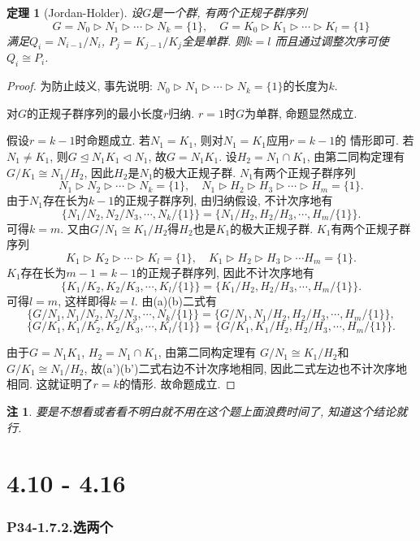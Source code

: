 \documentclass[12pt, a4paper, fontset=windows]{ctexart}
\newcommand{\isom}{\cong} %
\newtheorem*{remark}{注}
\newtheorem*{theorem}{定理}
\begin{document}
\begin{theorem}[Jordan-Holder]
设$G$是一个群, 有两个正规子群序列
\[G=N_0\rhd N_1\rhd\cdots\rhd N_k=\{1\},\quad G=K_0\rhd K_1\rhd\cdots\rhd K_l=\{1\}\]
满足$Q_i=N_{i-1}/N_i$, $P_j=K_{j-1}/K_j$全是单群. 则$k=l$
而且通过调整次序可使$Q_i\isom P_i$. 
\end{theorem}

\begin{proof}
为防止歧义, 事先说明: $N_0\rhd N_1\rhd\cdots\rhd N_k=\{1\}$的长度为$k$. 

对$G$的正规子群序列的最小长度$r$归纳. $r=1$时$G$为单群, 命题显然成立. 

假设$r=k-1$时命题成立. 若$N_1=K_1$, 则对$N_1=K_1$应用$r=k-1$的
情形即可. 若$N_1\ne K_1$, 则$G\unlhd N_1K_1\lhd N_1$, 
故$G=N_1K_1$. 设$H_2=N_1\cap K_1$, 
由第二同构定理有$G/K_1\isom N_1/H_2$, 因此$H_2$是$N_1$的极大正规子群. 
$N_1$有两个正规子群序列
\[N_1\rhd N_2\rhd\cdots\rhd N_k=\{1\},\quad N_1\rhd H_2\rhd H_3\rhd\cdots\rhd H_m=\{1\}. \]
由于$N_1$存在长为$k-1$的正规子群序列, 由归纳假设, 不计次序地有
\[\{N_1/N_2,N_2/N_3,\cdots,N_k/\{1\}\}=\{N_1/H_2,H_2/H_3,\cdots,H_m/\{1\}\}.\tag*{(a)}\]
可得$k=m$. 又由$G/N_1\isom K_1/H_2$得$H_2$也是$K_1$的极大正规子群. 
$K_1$有两个正规子群序列
\[K_1\rhd K_2\rhd\cdots\rhd K_l=\{1\},\quad K_1\rhd H_2\rhd H_3\rhd\cdots H_m=\{1\}. \]
$K_1$存在长为$m-1=k-1$的正规子群序列, 因此不计次序地有
\[\{K_1/K_2,K_2/K_3,\cdots,K_l/\{1\}\}=\{K_1/H_2,H_2/H_3,\cdots,H_m/\{1\}\}.\tag*{(b)}\]
可得$l=m$, 这样即得$k=l$. 由(a)(b)二式有
\[\{G/N_1,N_1/N_2,N_2/N_3,\cdots,N_k/\{1\}\}=\{G/N_1,N_1/H_2,H_2/H_3,\cdots,H_m/\{1\}\},\tag*{(a')}\]
\[\{G/K_1,K_1/K_2,K_2/K_3,\cdots,K_l/\{1\}\}=\{G/K_1,K_1/H_2,H_2/H_3,\cdots,H_m/\{1\}\}.\tag*{(b')}\]

由于$G=N_1K_1$, $H_2=N_1\cap K_1$, 由第二同构定理有
$G/N_1\isom K_1/H_2$和$G/K_1\isom N_1/H_2$, 
故(a')(b')二式右边不计次序地相同, 因此二式左边也不计次序地相同. 
这就证明了$r=k$的情形. 故命题成立. 
\end{proof}

\begin{remark}
要是不想看或者看不明白就不用在这个题上面浪费时间了, 知道这个结论就行. 
\end{remark}

\clearpage
\part{4.10 - 4.16}

\section*{P34-1.7.2.\normalsize 选两个}
\end{document}
